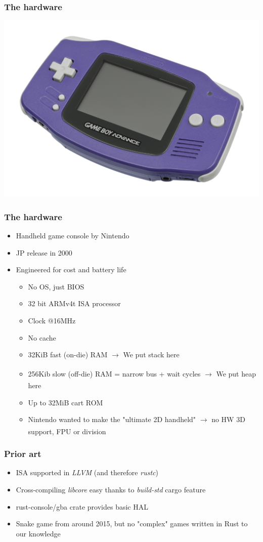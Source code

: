 \documentclass{beamer}
\begin{document}
\begin{frame}
	\frametitle{The hardware}
	\includegraphics[scale=0.28]{images/Nintendo-Game-Boy-Advance-Purple-FL.jpg}
\end{frame}

\begin{frame}
	\frametitle{The hardware}
	\begin{itemize}
		\item Handheld game console by Nintendo
		\item JP release in 2000
		\item Engineered for cost and battery life \begin{itemize}
			      \item No OS, just BIOS
			      \item 32 bit ARMv4t ISA processor
			      \item Clock @16MHz
			      \item No cache
			      \item 32KiB fast (on-die) RAM $\xrightarrow[]{}$ We put stack here
			      \item 256Kib slow (off-die) RAM = narrow bus + wait cycles $\xrightarrow[]{}$ We put heap here
			      \item Up to 32MiB cart ROM
			      \item Nintendo wanted to make the "ultimate 2D handheld" $\xrightarrow[]{}$ no HW 3D support, FPU or division
		      \end{itemize}
	\end{itemize}
\end{frame}

\begin{frame}
	\frametitle{Prior art}
	\begin{itemize}
		\item ISA supported in \emph{LLVM} (and therefore \emph{rustc})
		\item Cross-compiling \emph{libcore} easy thanks to \emph{build-std} cargo feature
		\item rust-console/gba crate provides basic HAL
		\item Snake game from around 2015, but no "complex" games written in Rust to our knowledge
	\end{itemize}
\end{frame}
\end{document}
